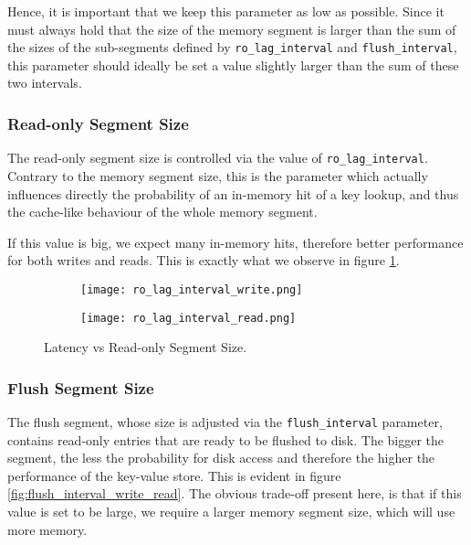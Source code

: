 Hence, it is important that we keep this parameter as low as possible. Since it must always hold that the size of the memory segment is larger than the sum of the sizes of the sub-segments defined by \verb"ro_lag_interval" and \verb"flush_interval", this parameter should ideally be set a value slightly larger than the sum of these two intervals.

\subsubsection{Read-only Segment Size}

The read-only segment size is controlled via the value of \verb"ro_lag_interval". Contrary to the memory segment size, this is the parameter which actually influences directly the probability of an in-memory hit of a key lookup, and thus the cache-like behaviour of the whole memory segment.

If this value is big, we expect many in-memory hits, therefore better performance for both writes and reads. This is exactly what we observe in figure \ref{fig:ro_lag_interval}.

\begin{figure}[H]
    \begin{subfigure}{.5\textwidth}
        \centering
        \texttt{[image: ro\_lag\_interval\_write.png]}
    \end{subfigure}
    \begin{subfigure}{.5\textwidth}
        \centering
        \texttt{[image: ro\_lag\_interval\_read.png]}
    \end{subfigure}
    \caption{Latency vs Read-only Segment Size.}
    \label{fig:ro_lag_interval}
\end{figure}

\subsubsection{Flush Segment Size}

The flush segment, whose size is adjusted via the \verb"flush_interval" parameter, contains read-only entries that are ready to be flushed to disk. The bigger the segment, the less the probability for disk access and therefore the higher the performance of the key-value store. This is evident in figure \ref{fig:flush_interval_write_read}. The obvious trade-off present here, is that if this value is set to be large, we require a larger memory segment size, which will use more memory.


